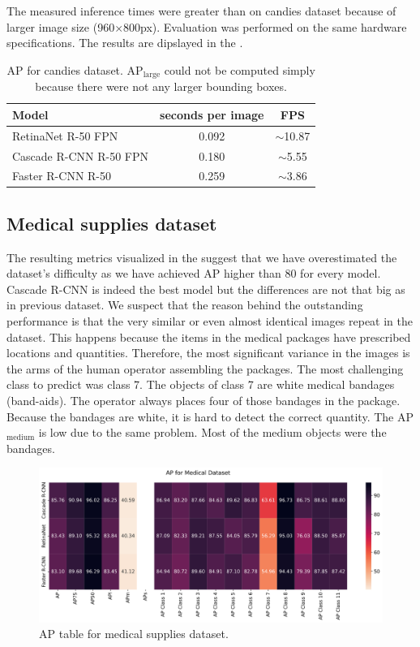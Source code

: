 The measured inference times were greater than on candies dataset because of
larger image size (960$\times$800px). Evaluation was performed on the same
hardware specifications. The results are dipslayed in the .

\begin{table}[H]
	\centering
	\small
	\begin{tabular}{l|c|c}
		Model                  & seconds per image & FPS                                \\
		\hline
		RetinaNet R-50 FPN     & 0.092             & \scriptsize $\sim$\normalsize10.87 \\
		Cascade R-CNN R-50 FPN & 0.180             & \scriptsize $\sim$\normalsize5.55  \\
		Faster R-CNN R-50      & 0.259             & \scriptsize $\sim$\normalsize3.86  \\
	\end{tabular}
	\normalsize
	\caption{AP for candies dataset. AP$_\text{large}$ could not be computed
		simply because there were not any larger bounding boxes.}
	\label{tab:metal_time}
\end{table}

\subsection*{Medical supplies dataset}
The resulting metrics visualized in the  suggest that
we have overestimated the dataset's difficulty as we have achieved AP higher
than 80 for every model. Cascade R-CNN is indeed the best model but the
differences are not that big as in previous dataset. We suspect that the reason
behind the outstanding performance is that the very similar or even almost
identical images repeat in the dataset. This happens because the items in the
medical packages have prescribed locations and quantities. Therefore, the most
significant variance in the images is the arms of the human operator assembling
the packages. The most challenging class to predict was class 7.  The objects of
class 7 are white medical bandages (band-aids). The operator always places four
of those bandages in the package. Because the bandages are white, it is hard to
detect the correct quantity. The AP$_{\text{medium}}$ is low due to the same
problem. Most of the medium objects were the bandages.

\begin{figure}[H]
	\includegraphics[width=\linewidth]{Sources/Figures/medical/medical_ap.png}
	\caption{AP table for medical supplies dataset.}
	\label{fig:medical_ap}
\end{figure}

